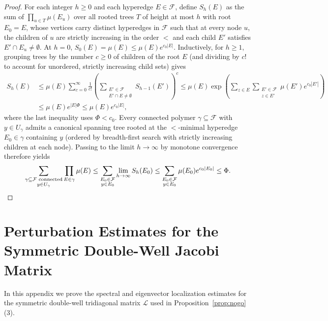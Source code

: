 \documentclass[11pt,a4paper]{article}
\numberwithin{equation}{section}
\theoremstyle{plain}
\theoremstyle{definition}
\begin{document}
\begin{proof}
For each integer $h\ge 0$ and each hyperedge $E\in\mathcal{F}$, define $S_h(E)$ as the sum of $\prod_{u\in T}\mu(E_u)$ over all rooted trees $T$ of height at most $h$ with root $E_0 = E$, whose vertices carry distinct hyperedges in $\mathcal{F}$ such that at every node $u$, the children of $u$ are strictly increasing in the order $<$ and each child $E'$ satisfies $E'\cap E_u \ne \emptyset$. At $h = 0$, $S_0(E) = \mu(E) \le \mu(E)e^{c_0|E|}$. Inductively, for $h\ge 1$, grouping trees by the number $c\ge 0$ of children of the root $E$ (and dividing by $c!$ to account for unordered, strictly increasing child sets) gives
\begin{align*}
  S_h(E)
  &\le \mu(E)\sum_{c=0}^\infty \frac{1}{c!}\left(\sum_{\substack{E'\in\mathcal{F} \\ E'\cap E\ne\emptyset}} S_{h-1}(E')\right)^c
   \le \mu(E)\exp\!\left(\sum_{z\in E}\sum_{\substack{E'\in\mathcal{F} \\ z\in E'}} \mu(E')e^{c_0|E'|}\right) \\
  &\le \mu(E)e^{|E|\Phi} \le \mu(E)e^{c_0|E|},
\end{align*}
where the last inequality uses $\Phi < c_0$. Every connected polymer $\gamma\subseteq\mathcal{F}$ with $y\in U_\gamma$ admits a canonical spanning tree rooted at the $<$-minimal hyperedge $E_0\in\gamma$ containing $y$ (ordered by breadth-first search with strictly increasing children at each node). Passing to the limit $h\to\infty$ by monotone convergence therefore yields
\[
  \sum_{\substack{\gamma\subseteq\mathcal{F}\text{ connected} \\ y\in U_\gamma}} \prod_{E\in\gamma} \mu(E)
  \le \sum_{\substack{E_0\in\mathcal{F} \\ y\in E_0}} \lim_{h\to\infty} S_h(E_0)
  \le \sum_{\substack{E_0\in\mathcal{F} \\ y\in E_0}} \mu(E_0)e^{c_0|E_0|}
  \le \Phi. \qedhere
\]
\end{proof}

\section{Perturbation Estimates for the Symmetric Double-Well Jacobi Matrix}\label{app:doublewell}

In this appendix we prove the spectral and eigenvector localization estimates for the symmetric double-well tridiagonal matrix $\mathcal{L}$ used in Proposition~\ref{prop:nogo}(3).
\end{document}
